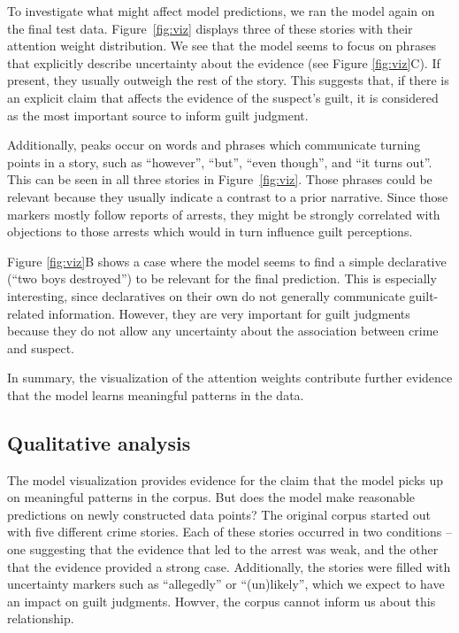 \documentclass[11pt,a4paper]{article}
\begin{document}
To investigate what might affect model predictions, we ran the model again on the final test data. Figure~\ref{fig:viz} displays three of these stories with their attention weight distribution.
We see that the model seems to focus on phrases that explicitly describe uncertainty about the evidence (see Figure \ref{fig:viz}C). If present, they usually outweigh the rest of the story. This suggests that, if there is an explicit claim that affects the evidence of the suspect's guilt, it is considered as the most important source to inform guilt judgment.

Additionally, peaks occur on words and phrases which communicate turning points in a story, such as ``however'', ``but'', ``even though'', and ``it turns out''. This can be seen in all three stories in Figure~\ref{fig:viz}. Those phrases could be relevant because they usually indicate a contrast to a prior narrative. Since those markers mostly follow reports of arrests, they might be strongly correlated with objections to those arrests which would in turn influence guilt perceptions.

Figure \ref{fig:viz}B shows a case where the model seems to find a simple declarative (``two boys destroyed'') to be relevant for the final prediction. This is especially interesting, since declaratives on their own do not generally communicate guilt-related information. However, they are very important for guilt judgments because they do not allow any uncertainty about the association between crime and suspect.

In summary, the visualization of the attention weights contribute further evidence that the model learns meaningful patterns in the data.


\subsection{Qualitative analysis}

The model visualization provides evidence for the claim that the model picks up on meaningful patterns in the corpus. But does the model make reasonable predictions on newly constructed data points?  The original corpus started out with five different crime stories. Each of these stories occurred in two conditions -- one suggesting that the evidence that led to the arrest was weak, and the other that the evidence provided a strong case. Additionally, the stories were filled with uncertainty markers such as ``allegedly'' or ``(un)likely'', which we expect to have an impact on guilt judgments. Howver, the corpus cannot inform us about this relationship.
\end{document}
